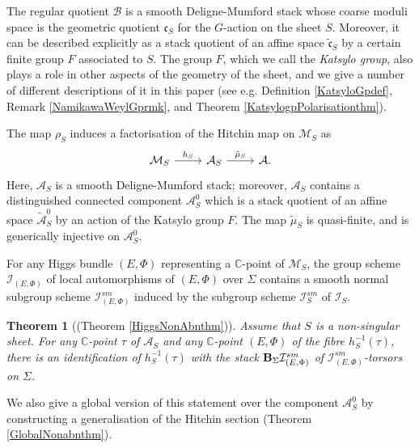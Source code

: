 \documentclass{amsart}
\newtheorem{theorem}{Theorem}
\theoremstyle{remark}
\numberwithin{theorem}{section}
\numberwithin{equation}{section}
\begin{document}
The regular quotient $\mathcal B$ is a smooth Deligne-Mumford stack whose coarse moduli space is the geometric quotient $\mathfrak{c}_S$ for the $G$-action on the sheet $S$. Moreover, it can be described explicitly as a stack quotient of an affine space $\tilde{\mathfrak{c}}_S$ by a certain finite group $F$ associated to $S$. The group $F$, which we call the \emph{Katsylo group}, also plays a role in other aspects of the geometry of the sheet, and we give a number of different descriptions of it in this paper (see e.g. Definition \ref{KatsyloGpdef}, Remark \ref{NamikawaWeylGprmk}, and Theorem \ref{KatsylogpPolarisationthm}).

The map $\rho_S$ induces a factorisation of the Hitchin map on $\mathcal M_S$ as
\begin{equation}\label{IntroSHitchineqn}
\begin{tikzcd}
\mathcal M_S \arrow[r, "h_S"] & \mathcal A_S \arrow[r, "\tilde{\mu}_S"] & \mathcal A.
\end{tikzcd}
\end{equation}
Here, $\mathcal A_S$ is a smooth Deligne-Mumford stack; moreover, $\mathcal A_S$ contains a distinguished connected component $\mathcal A^0_S$ which is a stack quotient of an affine space $\tilde{\mathcal A}_S^0$ by an action of the Katsylo group $F$. The map $\tilde{\mu}_S$ is quasi-finite, and is generically injective on $\mathcal A^0_S$.

For any Higgs bundle $(E, \Phi)$ representing a $\mathbb{C}$-point of $\mathcal M_S$, the group scheme $\mathcal I_{(E,\Phi)}$ of local automorphisms of $(E,\Phi)$ over $\Sigma$ contains a smooth normal subgroup scheme $\mathcal I^{sm}_{(E,\Phi)}$ induced by the subgroup scheme $\mathcal I_S^{sm}$ of $\mathcal I_S$.

\begin{theorem}[(Theorem \ref{HiggsNonAbnthm})]\label{IntroNonAbnthm}
    Assume that $S$ is a non-singular sheet. For any $\mathbb{C}$-point $\tau$ of $\mathcal A_S$ and any $\mathbb{C}$-point $(E,\Phi)$ of the fibre $h_S^{-1}(\tau)$, there is an identification of $h^{-1}_S(\tau)$ with the stack ${\bf B}_\Sigma \mathcal I^{sm}_{(E,\Phi)}$ of $\mathcal I^{sm}_{(E,\Phi)}$-torsors on $\Sigma$.
\end{theorem}

We also give a global version of this statement over the component $\mathcal A^0_S$ by constructing a generalisation of the Hitchin section (Theorem \ref{GlobalNonabnthm}).
\end{document}
